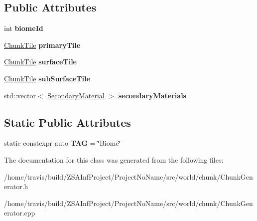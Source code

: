 \subsection*{Public Attributes}
\begin{DoxyCompactItemize}
\item 
\hypertarget{classBiome_a18a3a187676e49e4250a82871bef722f}{int {\bfseries biome\-Id}}\label{classBiome_a18a3a187676e49e4250a82871bef722f}

\item 
\hypertarget{classBiome_a18ad1a11ef83d49b1fbcf925bba29ff5}{\hyperlink{classChunkTile}{Chunk\-Tile} {\bfseries primary\-Tile}}\label{classBiome_a18ad1a11ef83d49b1fbcf925bba29ff5}

\item 
\hypertarget{classBiome_abd58396ce06a2255cf349d08d4ebc4d4}{\hyperlink{classChunkTile}{Chunk\-Tile} {\bfseries surface\-Tile}}\label{classBiome_abd58396ce06a2255cf349d08d4ebc4d4}

\item 
\hypertarget{classBiome_a85cc0f9115bc58dd3d55a8097f832ab8}{\hyperlink{classChunkTile}{Chunk\-Tile} {\bfseries sub\-Surface\-Tile}}\label{classBiome_a85cc0f9115bc58dd3d55a8097f832ab8}

\item 
\hypertarget{classBiome_ac2a44a25fddf50a56602da4553574c52}{std\-::vector$<$ \hyperlink{classSecondaryMaterial}{Secondary\-Material} $>$ {\bfseries secondary\-Materials}}\label{classBiome_ac2a44a25fddf50a56602da4553574c52}

\end{DoxyCompactItemize}
\subsection*{Static Public Attributes}
\begin{DoxyCompactItemize}
\item 
\hypertarget{classBiome_a5358d2284ad8408116e8201c2bf39ac6}{static constexpr auto {\bfseries T\-A\-G} = \char`\"{}Biome\char`\"{}}\label{classBiome_a5358d2284ad8408116e8201c2bf39ac6}

\end{DoxyCompactItemize}


The documentation for this class was generated from the following files\-:\begin{DoxyCompactItemize}
\item 
/home/travis/build/\-Z\-S\-A\-Inf\-Project/\-Project\-No\-Name/src/world/chunk/Chunk\-Generator.\-h\item 
/home/travis/build/\-Z\-S\-A\-Inf\-Project/\-Project\-No\-Name/src/world/chunk/Chunk\-Generator.\-cpp\end{DoxyCompactItemize}
